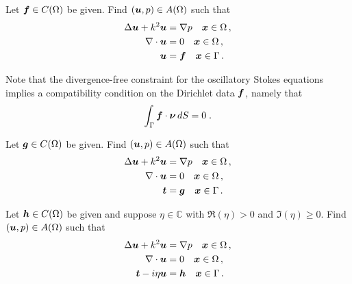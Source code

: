 \begin{definition}
  \label{def:int_dir}
  Let ${\boldsymbol f} \in C(\Omega)$ be given. Find $({\boldsymbol u},p) \in A(\Omega)$
  such that
  \begin{equation}
  \begin{aligned} \label{eq:dir_interior}
    \Delta {\boldsymbol u} + k^{2} {\boldsymbol u} &= \nabla p \quad {\boldsymbol x} \in \Omega \, ,\\
    \nabla \cdot {\boldsymbol u} &= 0 \quad {\boldsymbol x} \in \Omega \, ,  \\
    {\boldsymbol u} &= {\boldsymbol f} \quad {\boldsymbol x} \in \Gamma \, .
  \end{aligned}
  \end{equation}
\end{definition}
Note that the divergence-free constraint for the oscillatory
Stokes equations implies a compatibility condition on the
Dirichlet data ${\boldsymbol f}$, namely that
\begin{equation} \label{eq:dir_compat}
  \int_\Gamma {\boldsymbol f} \cdot {\boldsymbol \nu} \, dS = 0 \; .
\end{equation}


\begin{definition}
  \label{def:int_neu}
  Let ${\boldsymbol g} \in C(\Omega)$ be given. Find $({\boldsymbol u},p) \in A(\Omega)$
  such that
  \begin{equation}
  \begin{aligned} \label{eq:neu_interior}
    \Delta {\boldsymbol u} + k^{2} {\boldsymbol u} &= \nabla p \quad {\boldsymbol x} \in \Omega \, ,\\
    \nabla \cdot {\boldsymbol u} &= 0 \quad {\boldsymbol x} \in \Omega \, ,  \\
    {\boldsymbol t} &= {\boldsymbol g} \quad {\boldsymbol x} \in \Gamma \, .
  \end{aligned}
  \end{equation}
\end{definition}

\begin{definition}
\label{def:int_imp}
  Let ${\boldsymbol h} \in C(\Omega)$ be given and suppose 
  $\eta \in \mathbb{C}$ with $\Re{(\eta)} >0$ and $\Im{(\eta)}\ge 0$. 
  Find $({\boldsymbol u},p) \in A(\Omega)$  such that
  \begin{equation}
  \begin{aligned} \label{eq:imp_interior}
    \Delta {\boldsymbol u} + k^{2} {\boldsymbol u} &= \nabla p \quad {\boldsymbol x} \in \Omega \, ,\\
    \nabla \cdot {\boldsymbol u} &= 0 \quad {\boldsymbol x} \in \Omega \, ,  \\
    {\boldsymbol t} - i \eta {\boldsymbol u} &= {\boldsymbol h} \quad {\boldsymbol x} \in \Gamma \, .
  \end{aligned}
  \end{equation}
\end{definition}

